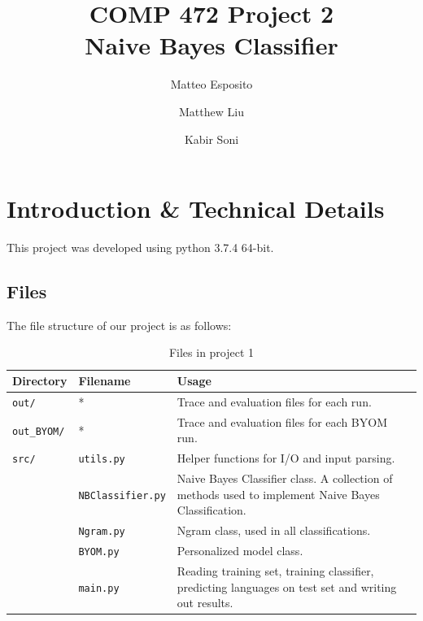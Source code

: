 \documentclass[runningheads]{llncs}
\begin{document}
\title{COMP 472 Project 2 \\ Naive Bayes Classifier}

\author{Matteo Esposito \and
Matthew Liu \and
Kabir Soni}



\maketitle   

\section{Introduction \& Technical Details}

This project was developed using python 3.7.4 64-bit.

\subsection{Files}

The file structure of our project is as follows:

\begin{table}
    \centering
    \caption{Files in project 1}\label{tab0}
    \begin{tabularx}{\textwidth}{|l|l|X|}
        \hline
        \textbf{Directory} & \textbf{Filename} & \textbf{Usage} \\ \hline
        \verb|out/| & * & Trace and evaluation files for each run. \\ \hline
        \verb|out_BYOM/| & * & Trace and evaluation files for each BYOM run. \\ \hline
        \verb|src/| & \verb|utils.py| & Helper functions for I/O and input parsing. \\ \hline
                    & \verb|NBClassifier.py| & Naive Bayes Classifier class. A collection of methods used to implement Naive Bayes Classification. \\ \hline
                    & \verb|Ngram.py| & Ngram class, used in all classifications. \\ \hline
                    & \verb|BYOM.py| & Personalized model class. \\ \hline
                    & \verb|main.py| & Reading training set, training classifier, predicting languages on test set and writing out results. \\ \hline
    \end{tabularx}
\end{table}
\end{document}
